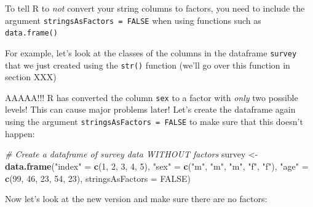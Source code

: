 \documentclass[]{book}
\newenvironment{Shaded}{\begin{snugshade}}{\end{snugshade}}
\newcommand{\KeywordTok}[1]{\textcolor[rgb]{0.13,0.29,0.53}{\textbf{{#1}}}}
\newcommand{\DataTypeTok}[1]{\textcolor[rgb]{0.13,0.29,0.53}{{#1}}}
\newcommand{\DecValTok}[1]{\textcolor[rgb]{0.00,0.00,0.81}{{#1}}}
\newcommand{\StringTok}[1]{\textcolor[rgb]{0.31,0.60,0.02}{{#1}}}
\newcommand{\CommentTok}[1]{\textcolor[rgb]{0.56,0.35,0.01}{\textit{{#1}}}}
\newcommand{\OtherTok}[1]{\textcolor[rgb]{0.56,0.35,0.01}{{#1}}}
\newcommand{\NormalTok}[1]{{#1}}
\theoremstyle{definition}
\theoremstyle{definition}
\theoremstyle{remark}
\begin{document}
To tell R to \emph{not} convert your string columns to factors, you need
to include the argument \texttt{stringsAsFactors\ =\ FALSE} when using
functions such as \texttt{data.frame()}

For example, let's look at the classes of the columns in the dataframe
\texttt{survey} that we just created using the \texttt{str()} function
(we'll go over this function in section XXX)

\begin{Shaded}
\end{Shaded}

AAAAA!!! R has converted the column \texttt{sex} to a factor with
\emph{only} two possible levels! This can cause major problems later!
Let's create the dataframe again using the argument
\texttt{stringsAsFactors\ =\ FALSE} to make sure that this doesn't
happen:

\begin{Shaded}
\begin{Highlighting}[]
\CommentTok{# Create a dataframe of survey data WITHOUT factors}
\NormalTok{survey <-}\StringTok{ }\KeywordTok{data.frame}\NormalTok{(}\StringTok{"index"} \NormalTok{=}\StringTok{ }\KeywordTok{c}\NormalTok{(}\DecValTok{1}\NormalTok{, }\DecValTok{2}\NormalTok{, }\DecValTok{3}\NormalTok{, }\DecValTok{4}\NormalTok{, }\DecValTok{5}\NormalTok{),}
                     \StringTok{"sex"} \NormalTok{=}\StringTok{ }\KeywordTok{c}\NormalTok{(}\StringTok{"m"}\NormalTok{, }\StringTok{"m"}\NormalTok{, }\StringTok{"m"}\NormalTok{, }\StringTok{"f"}\NormalTok{, }\StringTok{"f"}\NormalTok{),}
                     \StringTok{"age"} \NormalTok{=}\StringTok{ }\KeywordTok{c}\NormalTok{(}\DecValTok{99}\NormalTok{, }\DecValTok{46}\NormalTok{, }\DecValTok{23}\NormalTok{, }\DecValTok{54}\NormalTok{, }\DecValTok{23}\NormalTok{),}
                     \DataTypeTok{stringsAsFactors =} \OtherTok{FALSE}\NormalTok{)}
\end{Highlighting}
\end{Shaded}

Now let's look at the new version and make sure there are no factors:
\end{document}
